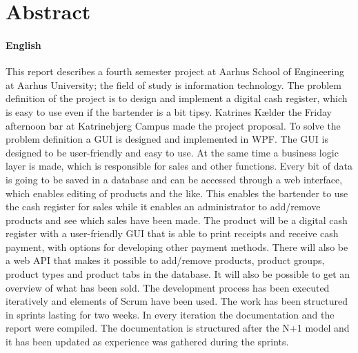 \chapter{Abstract}

\subsubsection*{English}

This report describes a fourth semester project at Aarhus School of Engineering at Aarhus University; 
the field of study is information technology. 
The problem definition of the project is to design and implement a digital cash register, which is easy to use even if the bartender is a bit tipsy. 
Katrines Kælder the Friday afternoon bar at Katrinebjerg Campus made the project proposal.
\newline
\newline
To solve the problem definition a \gls{GUI} is designed and implemented in \gls{WPF}. 
The \gls{GUI} is designed to be user-friendly and easy to use.
At the same time a business logic layer is made, which is responsible for sales and other functions. 
Every bit of data is going to be saved in a database and can be accessed through a web interface, which enables editing of products and the like. 
This enables the bartender to use the cash register for sales while it enables an administrator to add/remove products and see which sales have been made. 
\newline
\newline
The product will be a digital cash register with a user-friendly \gls{GUI} that is able to print receipts and receive cash payment, with options for developing other payment methods. 
There will also be a web API that makes it possible to add/remove products, product groups, product types and product tabs in the database. 
It will also be possible to get an overview of what has been sold. 
\newline
\newline
The development process has been executed iteratively and elements of Scrum have been used. 
The work has been structured in sprints lasting for two weeks. 
In every iteration the documentation and the report were compiled. 
The documentation is structured after the N+1 model and it has been updated as experience was gathered during the sprints. 